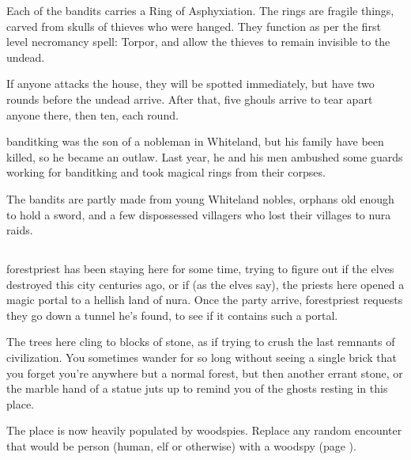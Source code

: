 \begin{multicols}{2}
Each of the bandits carries a Ring of Asphyxiation.
The rings are fragile things, carved from skulls of thieves who were hanged.
They function as per the first level necromancy spell: Torpor, and allow the thieves to remain invisible to the undead.

If anyone attacks the house, they will be spotted immediately, but have two rounds before the undead arrive.
After that, five ghouls arrive to tear apart anyone there, then ten, each round.

\banditking

\Gls{banditking} was the son of a nobleman in Whiteland, but his family have been killed, so he became an outlaw.
Last year, he and his men ambushed some guards working for \gls{banditking} and took magical rings from their corpses.

The bandits are partly made from young Whiteland nobles, orphans old enough to hold a sword, and a few dispossessed villagers who lost their villages to nura raids.


\subsection{}\label{lostcity}\setcounter{list}{0}

\Gls{forestpriest} has been staying here for some time, trying to figure out if the elves destroyed this city centuries ago, or if (as the elves say), the priests here opened a magic portal to a hellish land of nura.
Once the party arrive, \gls{forestpriest} requests they go down a tunnel he's found, to see if it contains such a portal.

\begin{boxtext}

The trees here cling to blocks of stone, as if trying to crush the last remnants of civilization.  You sometimes wander for so long without seeing a single brick that you forget you're anywhere but a normal forest, but then another errant stone, or the marble hand of a statue juts up to remind you of the ghosts resting in this place.

\end{boxtext}

The place is now heavily populated by woodspies.  Replace any random encounter that would be person (human, elf or otherwise) with a woodspy (page \pageref{woodspy}).

\end{multicols}

